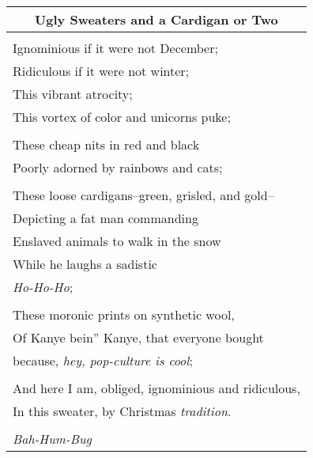 \documentclass{article}
\begin{document}
\newcommand{\h}{\hspace*{2ex}}
\newcommand{\hh}{\hspace*{4ex}}
\newcommand{\hhh}{\hspace*{6ex}}

\begin{center}
\begin{tabular}{l}
\multicolumn{1}{c}{\textbf{Ugly Sweaters and a Cardigan or Two}} \\\hline
\\
Ignominious if it were not December; \\
Ridiculous if it were not winter; \\
This vibrant atrocity; \\
This vortex of color and unicorns puke; \\
\\
These cheap nits in red and black \\
Poorly adorned by rainbows and cats; \\
\\
These loose cardigans--green, grisled, and gold-- \\
Depicting a fat man commanding \\
Enslaved animals to walk in the snow \\
While he laughs a sadistic \\
\textit{Ho-Ho-Ho}; \\
\\
These moronic prints on synthetic wool, \\
Of Kanye bein'' Kanye, that everyone bought \\
because, \textit{hey, pop-culture is cool}; \\
\\
And here I am, obliged, ignominious and ridiculous, \\
In this sweater, by Christmas \textit{tradition}. \\
\\
\textit{Bah-Hum-Bug} \\
\end{tabular}
\end{center}
\end{document}
